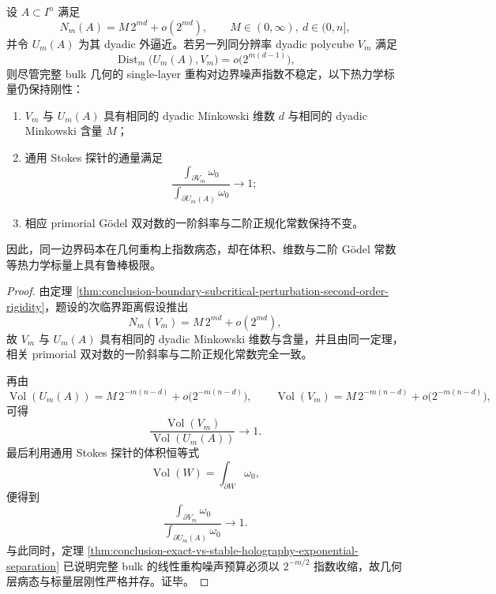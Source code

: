\begin{theorem}[几何全息病态与热力学标量刚性的分离]\label{thm:conclusion-geometric-holography-instability-vs-scalar-rigidity}
设 \(A\subset I^n\) 满足
\[
N_m(A)=M\,2^{md}+o(2^{md}),
\qquad
M\in(0,\infty),\ d\in(0,n],
\]
并令 \(U_m(A)\) 为其 dyadic 外逼近。若另一列同分辨率 dyadic polycube \(V_m\) 满足
\[
\operatorname{Dist}_m\bigl(U_m(A),V_m\bigr)=o\!\bigl(2^{m(d-1)}\bigr),
\]
则尽管完整 bulk 几何的 single-layer 重构对边界噪声指数不稳定，以下热力学标量仍保持刚性：
\begin{enumerate}
  \item \(V_m\) 与 \(U_m(A)\) 具有相同的 dyadic Minkowski 维数 \(d\) 与相同的 dyadic Minkowski 含量 \(M\)；
  \item 通用 Stokes 探针的通量满足
  \[
  \frac{\int_{\partial V_m}\omega_0}{\int_{\partial U_m(A)}\omega_0}\longrightarrow 1;
  \]
  \item 相应 primorial Gödel 双对数的一阶斜率与二阶正规化常数保持不变。
\end{enumerate}
因此，同一边界码本在几何重构上指数病态，却在体积、维数与二阶 Gödel 常数等热力学标量上具有鲁棒极限。
\end{theorem}
\begin{proof}
由定理 \ref{thm:conclusion-boundary-subcritical-perturbation-second-order-rigidity}，题设的次临界距离假设推出
\[
N_m(V_m)=M\,2^{md}+o(2^{md}),
\]
故 \(V_m\) 与 \(U_m(A)\) 具有相同的 dyadic Minkowski 维数与含量，并且由同一定理，相关 primorial 双对数的一阶斜率与二阶正规化常数完全一致。

再由
\[
\operatorname{Vol}(U_m(A))=M\,2^{-m(n-d)}+o\!\bigl(2^{-m(n-d)}\bigr),
\qquad
\operatorname{Vol}(V_m)=M\,2^{-m(n-d)}+o\!\bigl(2^{-m(n-d)}\bigr),
\]
可得
\[
\frac{\operatorname{Vol}(V_m)}{\operatorname{Vol}(U_m(A))}\to 1.
\]
最后利用通用 Stokes 探针的体积恒等式
\[
\operatorname{Vol}(W)=\int_{\partial W}\omega_0,
\]
便得到
\[
\frac{\int_{\partial V_m}\omega_0}{\int_{\partial U_m(A)}\omega_0}\to 1.
\]
与此同时，定理 \ref{thm:conclusion-exact-vs-stable-holography-exponential-separation} 已说明完整 bulk 的线性重构噪声预算必须以 \(2^{-m/2}\) 指数收缩，故几何层病态与标量层刚性严格并存。证毕。
\end{proof}

